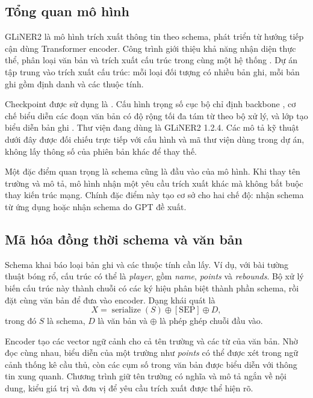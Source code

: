 \subsection{Tổng quan mô hình}
GLiNER2 là mô hình trích xuất thông tin theo schema, phát triển từ hướng tiếp cận dùng Transformer encoder. Công trình giới thiệu khả năng nhận diện thực thể, phân loại văn bản và trích xuất cấu trúc trong cùng một hệ thống \cite{gliner}. Dự án tập trung vào trích xuất cấu trúc: mỗi loại đối tượng có nhiều bản ghi, mỗi bản ghi gồm định danh và các thuộc tính.

Checkpoint được sử dụng là . Cấu hình trọng số cục bộ chỉ định backbone , cơ chế biểu diễn các đoạn văn bản có độ rộng tối đa tám từ theo bộ xử lý, và lớp tạo biểu diễn bản ghi . Thư viện đang dùng là GLiNER2 1.2.4. Các mô tả kỹ thuật dưới đây được đối chiếu trực tiếp với cấu hình và mã thư viện dùng trong dự án, không lấy thông số của phiên bản khác để thay thế.

Một đặc điểm quan trọng là schema cũng là đầu vào của mô hình. Khi thay tên trường và mô tả, mô hình nhận một yêu cầu trích xuất khác mà không bắt buộc thay kiến trúc mạng. Chính đặc điểm này tạo cơ sở cho hai chế độ: nhận schema từ ứng dụng hoặc nhận schema do GPT đề xuất.

\subsection{Mã hóa đồng thời schema và văn bản}
Schema khai báo loại bản ghi và các thuộc tính cần lấy. Ví dụ, với bài tường thuật bóng rổ, cấu trúc có thể là \textit{player}, gồm \textit{name}, \textit{points} và \textit{rebounds}. Bộ xử lý biến cấu trúc này thành chuỗi có các ký hiệu phân biệt thành phần schema, rồi đặt cùng văn bản để đưa vào encoder. Dạng khái quát là
\begin{equation}
X = \operatorname{serialize}(S)\oplus[\mathrm{SEP}]\oplus D,
\end{equation}
trong đó $S$ là schema, $D$ là văn bản và $\oplus$ là phép ghép chuỗi đầu vào.

Encoder tạo các vector ngữ cảnh cho cả tên trường và các từ của văn bản. Nhờ đọc cùng nhau, biểu diễn của một trường như \textit{points} có thể được xét trong ngữ cảnh thống kê cầu thủ, còn các cụm số trong văn bản được biểu diễn với thông tin xung quanh. Chương trình giữ tên trường có nghĩa và mô tả ngắn về nội dung, kiểu giá trị và đơn vị để yêu cầu trích xuất được thể hiện rõ.

